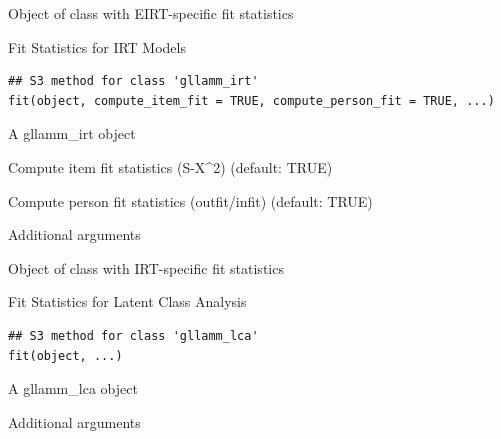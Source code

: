 \documentclass[a4paper]{book}
\begin{document}
%
\begin{Value}
Object of class  with EIRT-specific fit statistics
\end{Value}
%
\begin{Description}
Fit Statistics for IRT Models
\end{Description}
%
\begin{Usage}
\begin{verbatim}
## S3 method for class 'gllamm_irt'
fit(object, compute_item_fit = TRUE, compute_person_fit = TRUE, ...)
\end{verbatim}
\end{Usage}
%
\begin{Arguments}
\begin{ldescription}
\item[\code{object}] A gllamm\_irt object

\item[\code{compute\_item\_fit}] Compute item fit statistics (S-X\textasciicircum{}2) (default: TRUE)

\item[\code{compute\_person\_fit}] Compute person fit statistics (outfit/infit) (default: TRUE)

\item[\code{...}] Additional arguments
\end{ldescription}
\end{Arguments}
%
\begin{Value}
Object of class  with IRT-specific fit statistics
\end{Value}
%
\begin{Description}
Fit Statistics for Latent Class Analysis
\end{Description}
%
\begin{Usage}
\begin{verbatim}
## S3 method for class 'gllamm_lca'
fit(object, ...)
\end{verbatim}
\end{Usage}
%
\begin{Arguments}
\begin{ldescription}
\item[\code{object}] A gllamm\_lca object

\item[\code{...}] Additional arguments
\end{ldescription}
\end{Arguments}
\end{document}
